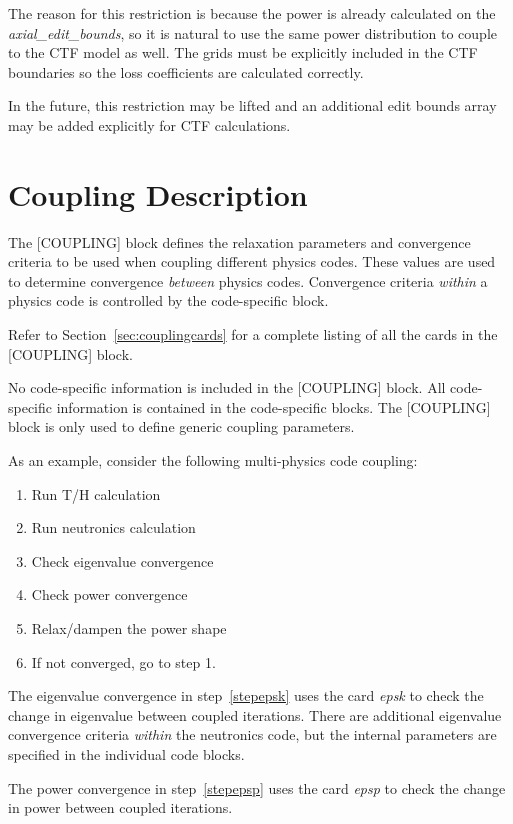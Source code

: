 The reason for this restriction is because the power is already calculated on the {\it axial\_edit\_bounds},
so it is natural to use the same power distribution to couple to the CTF model as well.
The grids must be explicitly included in the CTF boundaries so the loss coefficients are calculated correctly.

In the future, this restriction may be lifted and an additional edit bounds array may
be added explicitly for CTF calculations.


\section{Coupling Description}

The [COUPLING] block defines the relaxation parameters and convergence criteria to be
used when coupling different physics codes.  These values are used to determine
convergence {\it between} physics codes.  Convergence criteria {\it within} a physics
code is controlled by the code-specific block.

Refer to Section~\ref{sec:couplingcards} for a complete listing of all the cards in the [COUPLING] block.

No code-specific information is included in the [COUPLING] block.  All code-specific information
is contained in the code-specific blocks.  The [COUPLING] block is only used to define
generic coupling parameters.

As an example, consider the following multi-physics code coupling:
\begin{enumerate}
  \item  Run T/H calculation
  \item  Run neutronics calculation
  \item  Check eigenvalue convergence \label{stepepsk}
  \item  Check power convergence \label{stepepsp}
  \item  Relax/dampen the power shape
  \item  If not converged, go to step 1.
\end{enumerate}
The eigenvalue convergence in step~\ref{stepepsk} uses the card {\it epsk} to check
the change in eigenvalue between coupled iterations.
There are additional eigenvalue convergence criteria {\it within} the neutronics
code, but the internal parameters are specified in the individual code blocks.

The power convergence in step~\ref{stepepsp} uses the card {\it epsp} to check
the change in power between coupled iterations.

